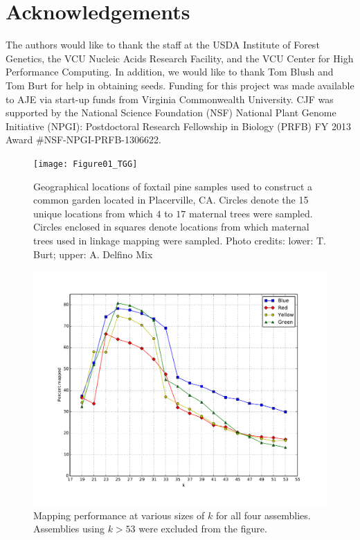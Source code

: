 \documentclass[11pt]{article}
\begin{document}
\section*{Acknowledgements}

The authors would like to thank the staff at the USDA Institute of Forest Genetics, the 
VCU Nucleic Acids Research Facility, and the VCU Center for High Performance Computing. 
In addition, we would like to thank Tom Blush and Tom Burt for help in obtaining 
seeds. Funding for this project was made available to AJE via start-up funds from Virginia 
Commonwealth University. CJF was supported by the National Science Foundation (NSF) National Plant Genome 
Initiative (NPGI): Postdoctoral Research Fellowship in Biology (PRFB) FY 2013 Award \#NSF-NPGI-PRFB-1306622.

\clearpage

\singlespacing



\clearpage

\begin{figure}[t]
\centering
\texttt{[image: Figure01\_TGG]}
\caption{Geographical locations of foxtail pine samples used to construct a common garden located in Placerville, CA. Circles
denote the 15 unique locations from which $4$ to $17$ maternal trees were sampled. Circles enclosed in squares denote
locations from which maternal trees used in linkage mapping were sampled. Photo credits: lower: T. Burt; upper: A. Delfino Mix}
\label{f:Figure01_TGG}
\end{figure}

\begin{figure}[t]
\centering
\includegraphics[width=1.0\textwidth]{mapping_performance}
\caption{Mapping performance at various sizes of $k$ for all four assemblies.  Assemblies using 
$k>53$ were excluded from the figure.}
\label{f:mapping_performance}
\end{figure}
\end{document}

